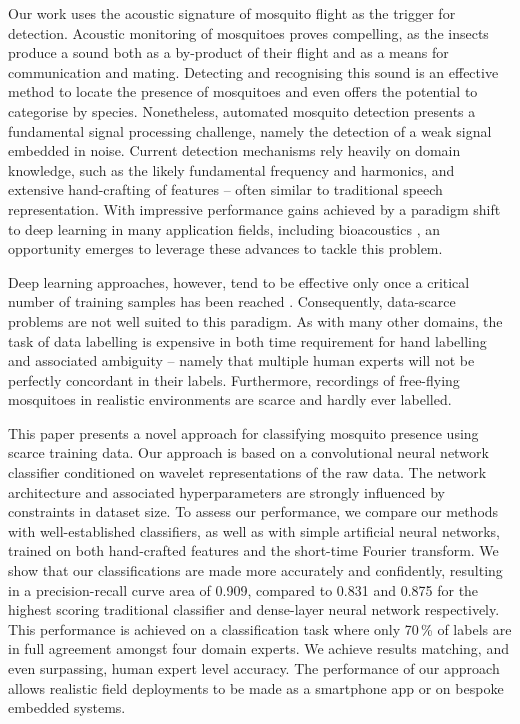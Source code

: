 \documentclass[10pt, twocolumn]{llncs}
\begin{document}
Our work uses the acoustic signature of mosquito flight as the trigger for detection. Acoustic monitoring of mosquitoes proves compelling, as the insects produce a sound both as a by-product of their flight and as a means for communication and mating. Detecting and recognising this sound is an effective method to locate the presence of mosquitoes and even offers the potential to categorise by species. Nonetheless, automated mosquito detection presents a fundamental signal processing challenge, namely the detection of a weak signal embedded in noise. Current detection mechanisms rely heavily on domain knowledge, such as the likely fundamental frequency and harmonics, and extensive hand-crafting of features -- often similar to traditional speech representation. With impressive performance gains achieved by a paradigm shift to deep learning in many application fields, including bioacoustics \cite{joly2016lifeclef}, an opportunity emerges to leverage these advances to tackle this problem.

Deep learning approaches, however, tend to be effective only once a critical number of training samples has been reached \cite{chen2014flying}. Consequently, data-scarce problems are not well suited to this paradigm. As with many other domains, the task of data labelling is expensive in both time requirement for hand labelling and associated ambiguity -- namely that multiple human experts will not be perfectly concordant in their labels. Furthermore, recordings of free-flying mosquitoes in realistic environments are scarce \cite{Mukundarajan2017} and hardly ever labelled.

This paper presents a novel approach for classifying mosquito presence using scarce training data. Our approach is based on a convolutional neural network classifier conditioned on wavelet representations of the raw data. The network architecture and associated hyperparameters are strongly influenced by constraints in dataset size. To assess our performance, we compare our methods with well-established classifiers, as well as with simple artificial neural networks, trained on both hand-crafted features and the short-time Fourier transform. We show that our classifications are made more accurately and confidently, resulting in a precision-recall curve area of 0.909, compared to 0.831 and 0.875 for the highest scoring traditional classifier and dense-layer neural network respectively. This performance is achieved on a classification task where only 70\,\% of labels are in full agreement amongst four domain experts. We achieve results matching, and even surpassing, human expert level accuracy. The performance of our approach allows realistic field deployments to be made as a smartphone app or on bespoke embedded systems.
\end{document}
